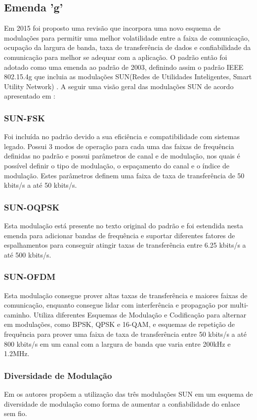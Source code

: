 \subsection*{Emenda 'g'}
Em 2015 foi proposto uma revisão que incorpora uma novo esquema de modulações para permitir uma melhor volatilidade entre a faixa de comunicação, ocupação da largura de banda, taxa de transferência de dados e confiabilidade da comunicação para melhor se adequar com a aplicação. O padrão então foi adotado como uma emenda ao padrão de 2003, definindo assim o padrão IEEE 802.15.4g que incluia as modulações SUN(Redes de Utilidades Inteligentes, Smart Utility Network) \cite{tuset2020reliability}.
A seguir uma visão geral das modulações SUN de acordo apresentado em \cite{tuset2020reliability}:
\subsubsection*{SUN-FSK}
Foi incluída no padrão devido a sua eficiência e compatibilidade com sistemas legado. Possui 3 modos de operação para cada uma das faixas de frequência definidas no padrão e possui parâmetros de canal e de modulação, nos quais é possível definir o tipo de modulação, o espaçamento do canal e o índice de modulação. Estes parâmetros definem uma faixa de taxa de transferência de 50 kbits/s a até 50 kbits/s.
\subsubsection*{SUN-OQPSK}
Esta modulação está presente no texto original do padrão e foi estendida nesta emenda para adicionar bandas de frequência e suportar diferentes fatores de espalhamentos para conseguir atingir taxas de transferência entre 6.25 kbits/s a até 500 kbits/s.
\subsubsection*{SUN-OFDM}
Esta modulação consegue prover altas taxas de transferência e maiores faixas de comunicação, enquanto consegue lidar com interferência e propagação por multi-caminho. Utiliza diferentes Esquemas de Modulação e Codificação para alternar em modulações, como BPSK, QPSK e 16-QAM, e esquemas de repetição de frequência para prover uma faixa de taxa de transferência entre 50 kbits/s a até 800 kbits/s em um canal com a largura de banda que varia entre 200kHz e 1.2MHz.

\subsubsection*{Diversidade de Modulação}
Em \cite{gomes2020improving} os autores propõem a utilização das três modulações SUN em um esquema de diversidade de modulação como forma de aumentar a confiabilidade do enlace sem fio.

